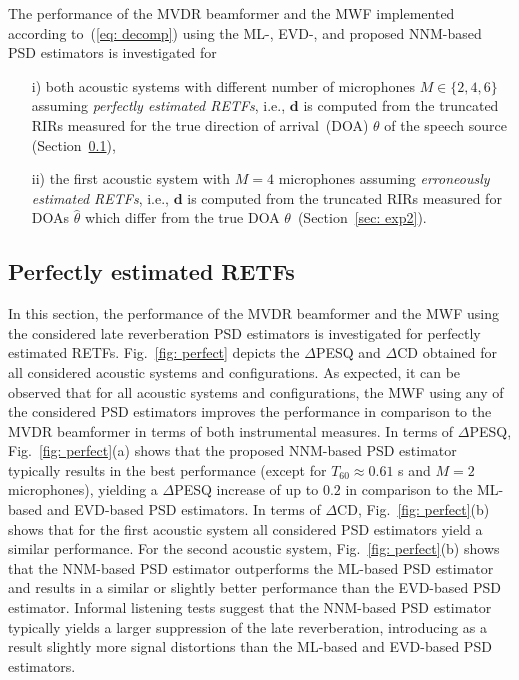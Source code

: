 \documentclass{article}
\begin{document}
The performance of the MVDR beamformer and the MWF implemented according to~(\ref{eq: decomp}) using the ML-, EVD-, and proposed NNM-based PSD estimators is investigated for 
\begin{itemize}
\item[i)] both acoustic systems with different number of microphones $M \in \{2, 4, 6 \}$ assuming {\emph{perfectly estimated RETFs}}, i.e., $\mathbf{d}$ is computed from the truncated RIRs measured for the true direction of arrival~(DOA) $\theta$ of the speech source (Section~\ref{sec: exp1}), 
\item[ii)] the first acoustic system with $M = 4$ microphones assuming {\emph{erroneously estimated RETFs}}, i.e., $\mathbf{d}$ is computed from the truncated RIRs measured for DOAs $\hat{\theta}$ which differ from the true DOA $\theta$~(Section~\ref{sec: exp2}).
\end{itemize}

\subsection{Perfectly estimated RETFs}
\label{sec: exp1}
In this section, the performance of the MVDR beamformer and the MWF using the considered late reverberation PSD estimators is investigated for perfectly estimated RETFs.
Fig.~\ref{fig: perfect} depicts the $\Delta$PESQ and $\Delta$CD obtained for all considered acoustic systems and configurations.
As expected, it can be observed that for all acoustic systems and configurations, the MWF using any of the considered PSD estimators improves the performance in comparison to the MVDR beamformer in terms of both instrumental measures.
In terms of $\Delta$PESQ, Fig.~\ref{fig: perfect}(a) shows that the proposed NNM-based PSD estimator typically results in the best performance (except for $T_{60} \approx 0.61$ s and $M = 2$ microphones), yielding a $\Delta$PESQ increase of up to $0.2$ in comparison to the ML-based and EVD-based PSD estimators.
In terms of $\Delta$CD, Fig.~\ref{fig: perfect}(b) shows that for the first acoustic system all considered PSD estimators yield a similar performance.
For the second acoustic system, Fig.~\ref{fig: perfect}(b) shows that the NNM-based PSD estimator outperforms the ML-based PSD estimator and results in a similar or slightly better performance than the EVD-based PSD estimator.
Informal listening tests suggest that the NNM-based PSD estimator typically yields a larger suppression of the late reverberation, introducing as a result slightly more signal distortions than the ML-based and EVD-based PSD estimators.
\end{document}
